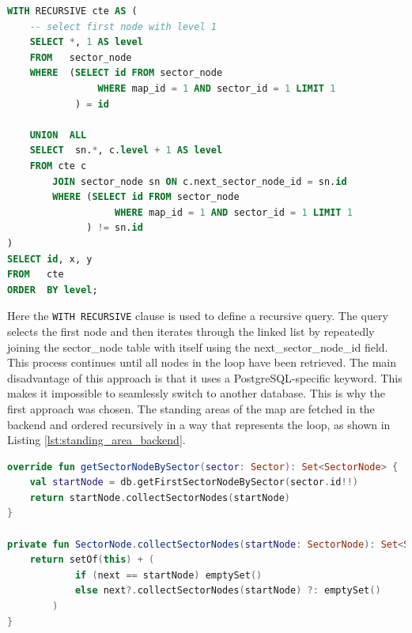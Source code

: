 \begin{lstlisting}[language=SQL, caption=Recursive Query, label=lst:recursive_query]
WITH RECURSIVE cte AS (
    -- select first node with level 1
    SELECT *, 1 AS level
    FROM   sector_node
    WHERE  (SELECT id FROM sector_node 
                WHERE map_id = 1 AND sector_id = 1 LIMIT 1
            ) = id

    UNION  ALL
    SELECT  sn.*, c.level + 1 AS level
    FROM cte c
        JOIN sector_node sn ON c.next_sector_node_id = sn.id 
        WHERE (SELECT id FROM sector_node 
                   WHERE map_id = 1 AND sector_id = 1 LIMIT 1
              ) != sn.id
)
SELECT id, x, y
FROM   cte
ORDER  BY level;
\end{lstlisting}

Here the \texttt{WITH RECURSIVE} clause is used to define a recursive query. The query selects the first node and then iterates through the linked list by repeatedly joining the sector\_node table with itself using the next\_sector\_node\_id field. This process continues until all nodes in the loop have been retrieved. The main disadvantage of this approach is that it uses a PostgreSQL-specific keyword. This makes it impossible to seamlessly switch to another database. This is why the first approach was chosen. The standing areas of the map are fetched in the backend and ordered recursively in a way that represents the loop, as shown in Listing \ref{lst:standing_area_backend}.

\begin{lstlisting}[language=Kotlin, caption=Standing Area Backend, label=lst:standing_area_backend]
override fun getSectorNodeBySector(sector: Sector): Set<SectorNode> {
    val startNode = db.getFirstSectorNodeBySector(sector.id!!)
    return startNode.collectSectorNodes(startNode)
}

private fun SectorNode.collectSectorNodes(startNode: SectorNode): Set<SectorNode> {
    return setOf(this) + (
            if (next == startNode) emptySet() 
            else next?.collectSectorNodes(startNode) ?: emptySet()
        )
}
\end{lstlisting}